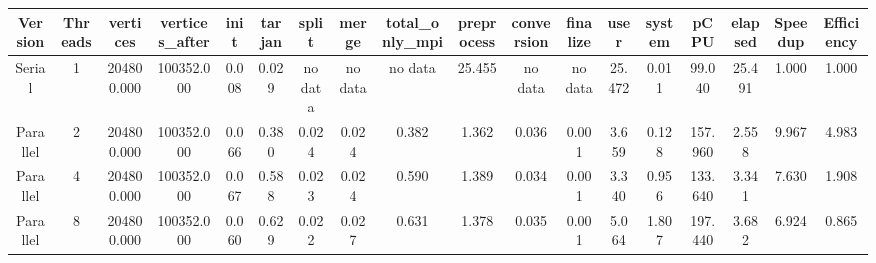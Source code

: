\begin{tabular}{|c|c|c|c|c|c|c|c|c|c|c|c|c|c|c|c|c|c|}
\toprule
 Version &  Threads &   vertices &  vertices\_after &  init &  tarjan &   split &   merge & total\_only\_mpi &  preprocess & conversion & finalize &   user &  system &    pCPU &  elapsed &  Speedup &  Efficiency \\
\midrule
  Serial &        1 & 204800.000 &      100352.000 & 0.008 &   0.029 & no data & no data &        no data &      25.455 &    no data &  no data & 25.472 &   0.011 &  99.040 &   25.491 &    1.000 &       1.000 \\
Parallel &        2 & 204800.000 &      100352.000 & 0.066 &   0.380 &   0.024 &   0.024 &          0.382 &       1.362 &      0.036 &    0.001 &  3.659 &   0.128 & 157.960 &    2.558 &    9.967 &       4.983 \\
Parallel &        4 & 204800.000 &      100352.000 & 0.067 &   0.588 &   0.023 &   0.024 &          0.590 &       1.389 &      0.034 &    0.001 &  3.340 &   0.956 & 133.640 &    3.341 &    7.630 &       1.908 \\
Parallel &        8 & 204800.000 &      100352.000 & 0.060 &   0.629 &   0.022 &   0.027 &          0.631 &       1.378 &      0.035 &    0.001 &  5.064 &   1.807 & 197.440 &    3.682 &    6.924 &       0.865 \\
\bottomrule
\end{tabular}
